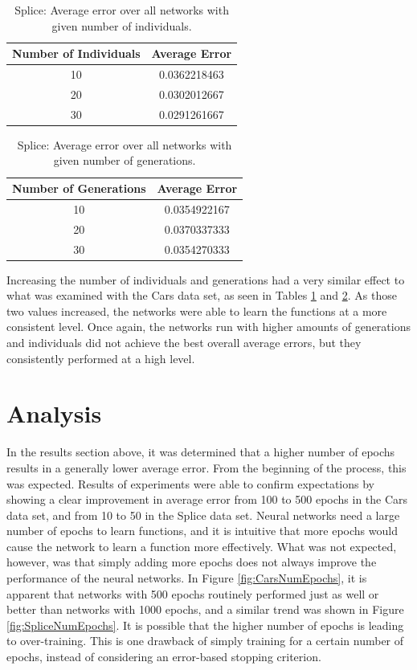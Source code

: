 \documentclass[10pt, conference, compsocconf]{IEEEtran}
\begin{document}
\begin{table}
\caption{Splice: Average error over all networks with given number of individuals.}
\label{tbl:SpliceIndividuals}
\centering
\begin{tabular}{c c}
\hline
Number of Individuals & Average Error \\
\hline
10 & 0.0362218463 \\
20 & 0.0302012667 \\
30 & 0.0291261667 \\
\hline
\end{tabular}
\end{table}

\begin{table}
\caption{Splice: Average error over all networks with given number of generations.}
\label{tbl:SpliceGenerations}
\centering
\begin{tabular}{c c}
\hline
Number of Generations & Average Error \\
\hline
10 & 0.0354922167 \\
20 & 0.0370337333 \\
30 & 0.0354270333 \\
\hline
\end{tabular}
\end{table}

Increasing the number of individuals and generations had a very similar effect to what was examined with the Cars data set, as seen in Tables \ref{tbl:SpliceIndividuals} and \ref{tbl:SpliceGenerations}. As those two values increased, the networks were able to learn the functions at a more consistent level. Once again, the networks run with higher amounts of generations and individuals did not achieve the best overall average errors, but they consistently performed at a high level.

\section{Analysis}

In the results section above, it was determined that a higher number of epochs results in a generally lower average error. From the beginning of the process, this was expected. Results of experiments were able to confirm expectations by showing a clear improvement in average error from 100 to 500 epochs in the Cars data set, and from 10 to 50 in the Splice data set. Neural networks need a large number of epochs to learn functions, and it is intuitive that more epochs would cause the network to learn a function more effectively. What was not expected, however, was that simply adding more epochs does not always improve the performance of the neural networks. In Figure \ref{fig:CarsNumEpochs}, it is apparent that networks with 500 epochs routinely performed just as well or better than networks with 1000 epochs, and a similar trend was shown in Figure \ref{fig:SpliceNumEpochs}. It is possible that the higher number of epochs is leading to over-training. This is one drawback of simply training for a certain number of epochs, instead of considering an error-based stopping criterion.
\end{document}
